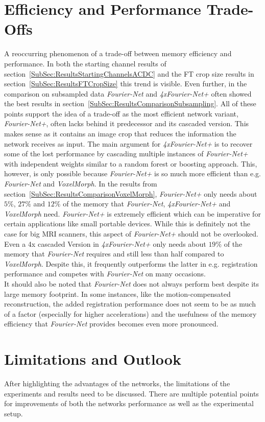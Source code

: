 \section{Efficiency and Performance Trade-Offs} \label{Sec:EfficiencyPerformanceTrade-offs}
A reoccurring phenomenon of a trade-off between memory efficiency and performance. In both the starting channel results of section~\ref{SubSec:ResultsStartingChannelsACDC} and the FT crop size results in section~\ref{SubSec:ResultsFTCropSize} this trend is visible. Even further, in the comparison on subsampled data \emph{Fourier-Net} and \emph{4xFourier-Net+} often showed the best results in section~\ref{SubSec:ResultsComparisonSubsampling}. All of these points support the idea of a trade-off as the most efficient network variant, \emph{Fourier-Net+}, often lacks behind it predecessor and its cascaded version. This makes sense as it contains an image crop that reduces the information the network receives as input. The main argument for \emph{4xFourier-Net+} is to recover some of the lost performance by cascading multiple instances of \emph{Fourier-Net+} with independent weights similar to a random forest or boosting approach. This, however, is only possible because \emph{Fourier-Net+} is so much more efficient than e.g. \emph{Fourier-Net} and \emph{VoxelMorph}. In the results from section~\ref{SubSec:ResultsComparisonVoxelMorph}, \emph{Fourier-Net+} only needs about $5 \%$, $27 \%$ and $12 \%$ of the memory that \emph{Fourier-Net}, \emph{4xFourier-Net+} and \emph{VoxelMorph} need. \emph{Fourier-Net+} is extremely efficient which can be imperative for certain applications like small portable devices. While this is definitely not the case for big MRI scanners, this aspect of \emph{Fourier-Net+} should not be overlooked. Even a 4x cascaded Version in \emph{4xFourier-Net+} only needs about $19 \%$ of the memory that \emph{Fourier-Net} requires and still less than half compared to \emph{VoxelMorph}. Despite this, it frequently outperforms the latter in e.g. registration performance and competes with \emph{Fourier-Net} on many occasions.\\
It should also be noted that \emph{Fourier-Net} does not always perform best despite its large memory footprint. In some instances, like the motion-compensated reconstruction, the added registration performance does not seem to be as much of a factor (especially for higher accelerations) and the usefulness of the memory efficiency that \emph{Fourier-Net} provides becomes even more pronounced.

\section{Limitations and Outlook} \label{Sec:LimitationsOutlook}
After highlighting the advantages of the networks, the limitations of the experiments and results need to be discussed. There are multiple potential points for improvements of both the networks performance as well as the experimental setup. 

